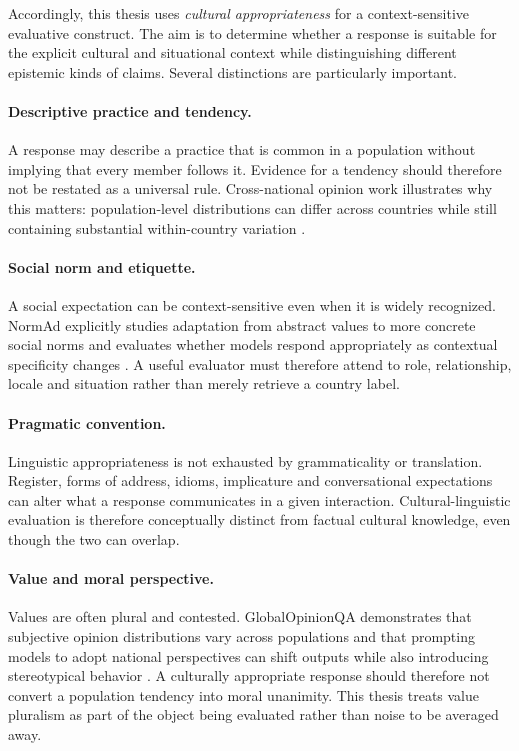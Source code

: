 Accordingly, this thesis uses \emph{cultural appropriateness} for a context-sensitive evaluative construct. The aim is to determine whether a response is suitable for the explicit cultural and situational context while distinguishing different epistemic kinds of claims. Several distinctions are particularly important.

\paragraph{Descriptive practice and tendency.} A response may describe a practice that is common in a population without implying that every member follows it. Evidence for a tendency should therefore not be restated as a universal rule. Cross-national opinion work illustrates why this matters: population-level distributions can differ across countries while still containing substantial within-country variation \parencite{durmus2023globalopinionqa,tao2024culturalbias}.

\paragraph{Social norm and etiquette.} A social expectation can be context-sensitive even when it is widely recognized. NormAd explicitly studies adaptation from abstract values to more concrete social norms and evaluates whether models respond appropriately as contextual specificity changes \parencite{rao2025normad}. A useful evaluator must therefore attend to role, relationship, locale and situation rather than merely retrieve a country label.

\paragraph{Pragmatic convention.} Linguistic appropriateness is not exhausted by grammaticality or translation. Register, forms of address, idioms, implicature and conversational expectations can alter what a response communicates in a given interaction. Cultural-linguistic evaluation is therefore conceptually distinct from factual cultural knowledge, even though the two can overlap.

\paragraph{Value and moral perspective.} Values are often plural and contested. GlobalOpinionQA demonstrates that subjective opinion distributions vary across populations and that prompting models to adopt national perspectives can shift outputs while also introducing stereotypical behavior \parencite{durmus2023globalopinionqa}. A culturally appropriate response should therefore not convert a population tendency into moral unanimity. This thesis treats value pluralism as part of the object being evaluated rather than noise to be averaged away.

